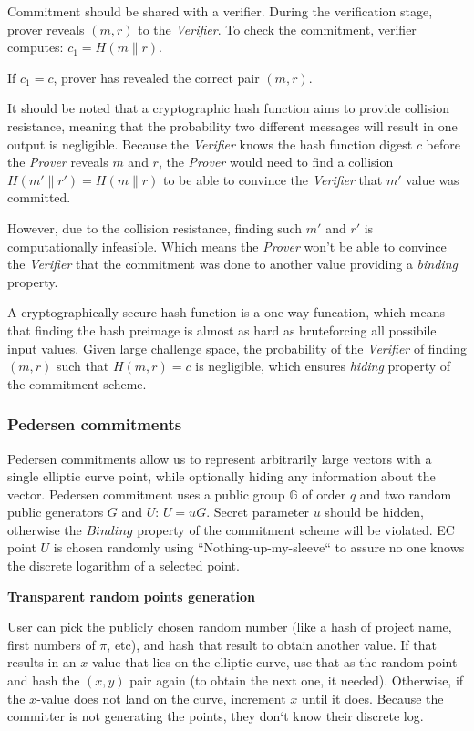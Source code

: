 \documentclass[../lecture-notes.tex]{subfiles}
\begin{document}
Commitment should be shared with a verifier. During the verification stage, prover reveals $(m, r)$ to the \textit{Verifier}. 
To check the commitment, verifier computes: $c_1 = H(m \parallel r)$.

If $c_1 = c$, prover has revealed the correct pair $(m, r)$.

It should be noted that a cryptographic hash function aims to provide collision resistance, 
meaning that the probability two different messages will result in one output is negligible.
Because the \textit{Verifier} knows the hash function digest $c$ before the \textit{Prover} reveals $m$ and $r$, 
the \textit{Prover} would need to find a collision $H(m' \parallel r') = H(m \parallel r)$ to be able to convince the \textit{Verifier}
that $m'$ value was committed.

However, due to the collision resistance, finding such $m'$ and $r'$ is computationally infeasible. Which means the \textit{Prover}
won't be able to convince the \textit{Verifier} that the commitment was done to another value providing a \textit{binding} property.

A cryptographically secure hash function is a one-way funcation, which means that finding the hash preimage is almost as hard as bruteforcing
all possibile input values. Given large challenge space, the probability of the \textit{Verifier} of finding $(m, r)$ such that
$H(m, r) = c$ is negligible, which ensures \textit{hiding} property of the commitment scheme. 


\subsubsection{Pedersen commitments}

Pedersen commitments allow us to represent arbitrarily large vectors with a single elliptic curve point, while optionally hiding any information about the vector. Pedersen commitment uses a public group $\mathbb{G}$ of order $q$ and two random public generators $G$ and $U$: $U = uG$. Secret parameter $u$ should be hidden, otherwise the $\textit{Binding}$ property of the commitment scheme will be violated.
EC point $U$ is chosen randomly using ``Nothing-up-my-sleeve`` to assure no one knows the discrete logarithm of a selected point.

\begin{remark}
    \textbf{Transparent random points generation}

    User can pick the publicly chosen random number (like a hash of project name, first numbers of $\pi$, etc), and hash that result to obtain another value. If that results in an $x$ value that lies on the elliptic curve, use that as the random point and hash the $(x, y)$ pair again (to obtain the next one, it needed). Otherwise, if the $x$-value does not land on the curve, increment $x$ until it does. Because the committer is not generating the points, they don`t know their discrete log. 
\end{remark}
\end{document}
